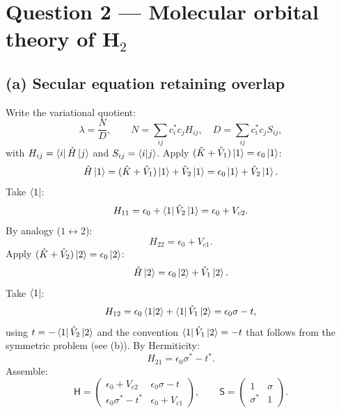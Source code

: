 \documentclass[11pt]{article}
\begin{document}
\section*{Question 2 --- Molecular orbital theory of H$_2$}

\subsection*{(a) Secular equation retaining overlap}

Write the variational quotient:
\begin{equation}
\lambda=\frac{N}{D},\qquad N=\sum_{ij}c_i^{*}c_j H_{ij},\quad D=\sum_{ij}c_i^{*}c_j S_{ij},
\end{equation}
with $H_{ij}=\bra i\hat H\ket j$ and $S_{ij}=\braket{i|j}$. Apply $(\hat K+\hat V_1)\ket1=\epsilon_0\ket1$:
\begin{equation}
\hat H\ket 1=(\hat K+\hat V_1)\ket 1+\hat V_2\ket1=\epsilon_0\ket1+\hat V_2\ket1.
\end{equation}
Take $\bra 1$:
\begin{equation}
H_{11}=\epsilon_0+\bra1\hat V_2\ket1=\epsilon_0+V_{c2}.
\end{equation}
By analogy ($1\leftrightarrow 2$):
\begin{equation}
H_{22}=\epsilon_0+V_{c1}.
\end{equation}
Apply $(\hat K+\hat V_2)\ket2=\epsilon_0\ket2$:
\begin{equation}
\hat H\ket 2=\epsilon_0\ket 2+\hat V_1\ket 2.
\end{equation}
Take $\bra 1$:
\begin{equation}
H_{12}=\epsilon_0\braket{1|2}+\bra1\hat V_1\ket2=\epsilon_0\sigma-t,
\end{equation}
using $t=-\bra1\hat V_2\ket2$ and the convention $\bra1\hat V_1\ket2=-t$ that follows from the symmetric problem (see (b)). By Hermiticity:
\begin{equation}
H_{21}=\epsilon_0\sigma^{*}-t^{*}.
\end{equation}
Assemble:
\begin{equation}
\mathsf H=\begin{pmatrix}\epsilon_0+V_{c2}&\epsilon_0\sigma-t\\\epsilon_0\sigma^{*}-t^{*}&\epsilon_0+V_{c1}\end{pmatrix},\qquad
\mathsf S=\begin{pmatrix}1&\sigma\\\sigma^{*}&1\end{pmatrix}.
\label{eq:HS-mat}
\end{equation}
\end{document}
